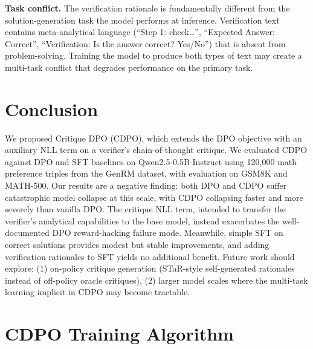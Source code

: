 \documentclass[11pt]{article}
\begin{document}
\textbf{Task conflict.} The verification rationale is fundamentally different from the solution-generation task the model performs at inference. Verification text contains meta-analytical language (``Step 1: check\ldots'', ``Expected Answer: Correct'', ``Verification: Is the answer correct? Yes/No'') that is absent from problem-solving. Training the model to produce both types of text may create a multi-task conflict that degrades performance on the primary task.

\section{Conclusion}
\label{sec:conclusion}

We proposed Critique DPO (CDPO), which extends the DPO objective with an auxiliary NLL term on a verifier's chain-of-thought critique. We evaluated CDPO against DPO and SFT baselines on Qwen2.5-0.5B-Instruct using 120{,}000 math preference triples from the GenRM dataset, with evaluation on GSM8K and MATH-500. Our results are a negative finding: both DPO and CDPO suffer catastrophic model collapse at this scale, with CDPO collapsing faster and more severely than vanilla DPO. The critique NLL term, intended to transfer the verifier's analytical capabilities to the base model, instead exacerbates the well-documented DPO reward-hacking failure mode. Meanwhile, simple SFT on correct solutions provides modest but stable improvements, and adding verification rationales to SFT yields no additional benefit. Future work should explore: (1) on-policy critique generation (STaR-style self-generated rationales instead of off-policy oracle critiques), (2) larger model scales where the multi-task learning implicit in CDPO may become tractable.


\newpage
\appendix
\section{CDPO Training Algorithm}
\label{app:algorithm}
\end{document}
